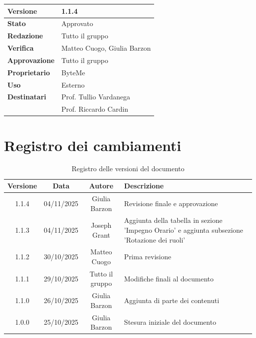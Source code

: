 \documentclass[11pt,a4paper]{article}
\begin{document}
\begin{titlepage}
    \begin{table}[H]
        \centering
        \begin{tabular}{|l|p{5cm}|}            
            \hline
            \textbf{Versione} & 1.1.4 \\
            \hline
            \textbf{Stato} & Approvato \\
            \hline
            \textbf{Redazione} & Tutto il gruppo \\
            \hline
            \textbf{Verifica} & Matteo Cuogo, Giulia Barzon \\
            \hline
            \textbf{Approvazione} & Tutto il gruppo \\
            \hline
            \textbf{Proprietario} & ByteMe \\
            \hline
            \textbf{Uso} & Esterno \\
            \hline
            \textbf{Destinatari} & Prof. Tullio Vardanega \\ & Prof. Riccardo Cardin \\
            \hline
        \end{tabular}
    \end{table}
    
    \vfill
\end{titlepage}

\section*{Registro dei cambiamenti}

\begin{table}[H]
    \centering
    \begin{tabular}{|c|c|c|>{\raggedright\arraybackslash}p{}|}
        \hline
        \textbf{Versione} & \textbf{Data} & \textbf{Autore} & \textbf{Descrizione} \\
        \hline
        1.1.4 & 04/11/2025 & Giulia Barzon & Revisione finale e approvazione\\
        \hline
        1.1.3 & 04/11/2025 & Joseph Grant & Aggiunta della tabella in sezione 'Impegno Orario' e aggiunta subsezione 'Rotazione dei ruoli'  \\
        \hline
        1.1.2 & 30/10/2025 & Matteo Cuogo & Prima revisione \\
        \hline
        1.1.1 & 29/10/2025 & Tutto il gruppo & Modifiche finali al documento \\
        \hline
        1.1.0 & 26/10/2025 & Giulia Barzon & Aggiunta di parte dei contenuti \\
        \hline
        1.0.0 & 25/10/2025 & Giulia Barzon & Stesura iniziale del documento \\
        \hline
    \end{tabular}
    \caption{Registro delle versioni del documento}
    \label{tab:versionamento}
\end{table}
\end{document}

